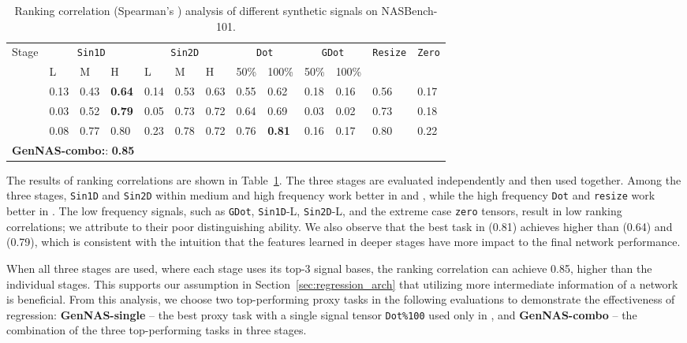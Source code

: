 \documentclass{article}
\begin{document}
\begin{table}
\vspace{-8pt}
\small
  \caption{Ranking correlation (Spearman's ) analysis of different synthetic signals on NASBench-101. }\label{table:signal_ablation}
  \centering
  \scriptsize
\begin{tabular}{cllllllllllll}
\toprule
\multirow{2}{*}{Stage} & \multicolumn{3}{c}{\texttt{Sin1D}} & \multicolumn{3}{c}{\texttt{Sin2D}} & \multicolumn{2}{c}{\texttt{Dot}} & \multicolumn{2}{c}{\texttt{GDot}} & \multirow{2}{*}{\texttt{Resize}} & \multirow{2}{*}{\texttt{Zero}}\\
\cmidrule(r){2-11}
                  &   L    &    M   &   H   &  L     &    M   &   H   &      50\%     &    100\%      &     50\%      &    100\%      &        &           \\
\midrule
 & 0.13 & 0.43 & \textbf{0.64} & 0.14 & 0.53 & {0.63} & 0.55 & 0.62 & 0.18 & 0.16 & 0.56 & 0.17\\
 & 0.03 & 0.52 & \textbf{0.79} & 0.05 & 0.73 & 0.72 & 0.64 & 0.69 & 0.03 & 0.02 & 0.73 & 0.18\\
 & 0.08 & 0.77 & 0.80 & 0.23 & 0.78 & 0.72 & 0.76 & \textbf{0.81} & 0.16 & 0.17 & 0.80 & 0.22\\\midrule
\multicolumn{11}{l}{\textbf{GenNAS-combo:}: \textbf{0.85}} \\
\bottomrule
\end{tabular}
\vspace{-8pt}
\end{table}

The results of ranking correlations are shown in Table~\ref{table:signal_ablation}.
The three stages are evaluated independently and then used together.
Among the three stages,
\texttt{Sin1D} and \texttt{Sin2D} within medium and high frequency work better in  and , while the high frequency \texttt{Dot} and \texttt{resize} work better in . 
The low frequency signals, such as \texttt{GDot}, \texttt{Sin1D}-L, \texttt{Sin2D}-L, and the extreme case \texttt{zero} tensors, result in low ranking correlations; we attribute to their poor distinguishing ability. 
We also observe that the best task in  (0.81) achieves higher  than  (0.64) and  (0.79), which is consistent with the intuition that the features learned in deeper stages have more impact to the final network performance. 

When all three stages are used, where each stage uses its top-3 signal bases,
the ranking correlation can achieve 0.85, higher than the individual stages. This supports our assumption in Section~\ref{sec:regression_arch} that utilizing more intermediate information of a network is beneficial. 
From this analysis, we choose two top-performing proxy tasks in the following evaluations to demonstrate the effectiveness of regression:
\textbf{GenNAS-single} -- the best proxy task with a single signal tensor \texttt{Dot\%100} used only in ,
and \textbf{GenNAS-combo} -- the combination of the three top-performing tasks in three stages.
\end{document}
